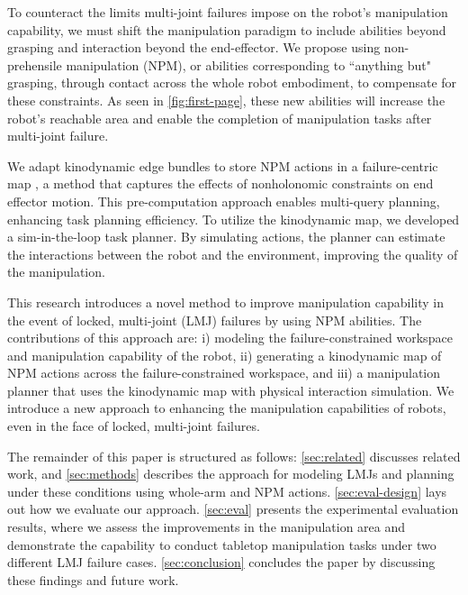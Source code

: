 To counteract the limits multi-joint failures impose on the robot's manipulation capability, we must shift the manipulation paradigm to include abilities beyond grasping and interaction beyond the end-effector. We propose using non-prehensile manipulation (NPM), or abilities corresponding to ``anything but" grasping, through contact across the whole robot embodiment, to compensate for these constraints. As seen in \cref{fig:first-page}, these new abilities will increase the robot's reachable area and enable the completion of manipulation tasks after multi-joint failure.

We adapt kinodynamic edge bundles to store NPM actions in a failure-centric map \cite{shome2021asymptotically}, a method that captures the effects of nonholonomic constraints on end effector motion. This pre-computation approach enables multi-query planning, enhancing task planning efficiency. To utilize the kinodynamic map, we developed a sim-in-the-loop task planner. By simulating actions, the planner can estimate the interactions between the robot and the environment, improving the quality of the manipulation.

This research introduces a novel method to improve manipulation capability in the event of locked, multi-joint (LMJ) failures \cite{lewis1997fault, xie2021maximizing} by using NPM abilities. The contributions of this approach are: i) modeling the failure-constrained workspace and manipulation capability of the robot, ii) generating a kinodynamic map of NPM actions across the failure-constrained workspace, and iii) a manipulation planner that uses the kinodynamic map with physical interaction simulation. We introduce a new approach to enhancing the manipulation capabilities of robots, even in the face of locked, multi-joint failures.

The remainder of this paper is structured as follows: \cref{sec:related} discusses related work, and \cref{sec:methods} describes the approach for modeling LMJs and planning under these conditions using whole-arm and NPM actions. \cref{sec:eval-design} lays out how we evaluate our approach. \cref{sec:eval} presents the experimental evaluation results, where we assess the improvements in the manipulation area and demonstrate the capability to conduct tabletop manipulation tasks under two different LMJ failure cases. \cref{sec:conclusion} concludes the paper by discussing these findings and future work.

